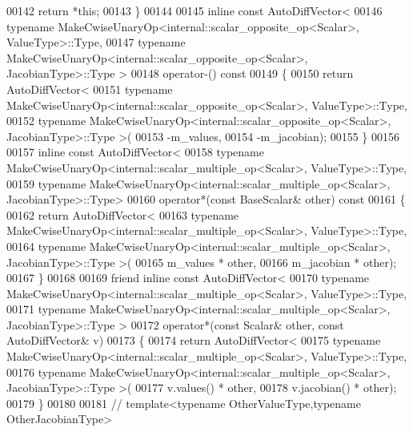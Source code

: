 \begin{DoxyCode}
00142       \textcolor{keywordflow}{return} *\textcolor{keyword}{this};
00143     \}
00144 
00145     \textcolor{keyword}{inline} \textcolor{keyword}{const} AutoDiffVector<
00146       \textcolor{keyword}{typename} MakeCwiseUnaryOp<internal::scalar\_opposite\_op<Scalar>, ValueType>::Type,
00147       \textcolor{keyword}{typename} MakeCwiseUnaryOp<internal::scalar\_opposite\_op<Scalar>, JacobianType>::Type >
00148     operator-()\textcolor{keyword}{ const}
00149 \textcolor{keyword}{    }\{
00150       \textcolor{keywordflow}{return} AutoDiffVector<
00151         \textcolor{keyword}{typename} MakeCwiseUnaryOp<internal::scalar\_opposite\_op<Scalar>, ValueType>::Type,
00152         \textcolor{keyword}{typename} MakeCwiseUnaryOp<internal::scalar\_opposite\_op<Scalar>, JacobianType>::Type >(
00153           -m\_values,
00154           -m\_jacobian);
00155     \}
00156 
00157     \textcolor{keyword}{inline} \textcolor{keyword}{const} AutoDiffVector<
00158       \textcolor{keyword}{typename} MakeCwiseUnaryOp<internal::scalar\_multiple\_op<Scalar>, ValueType>::Type,
00159       \textcolor{keyword}{typename} MakeCwiseUnaryOp<internal::scalar\_multiple\_op<Scalar>, JacobianType>::Type>
00160     operator*(\textcolor{keyword}{const} BaseScalar& other)\textcolor{keyword}{ const}
00161 \textcolor{keyword}{    }\{
00162       \textcolor{keywordflow}{return} AutoDiffVector<
00163         \textcolor{keyword}{typename} MakeCwiseUnaryOp<internal::scalar\_multiple\_op<Scalar>, ValueType>::Type,
00164         \textcolor{keyword}{typename} MakeCwiseUnaryOp<internal::scalar\_multiple\_op<Scalar>, JacobianType>::Type >(
00165           m\_values * other,
00166           m\_jacobian * other);
00167     \}
00168 
00169     \textcolor{keyword}{friend} \textcolor{keyword}{inline} \textcolor{keyword}{const} AutoDiffVector<
00170       \textcolor{keyword}{typename} MakeCwiseUnaryOp<internal::scalar\_multiple\_op<Scalar>, ValueType>::Type,
00171       \textcolor{keyword}{typename} MakeCwiseUnaryOp<internal::scalar\_multiple\_op<Scalar>, JacobianType>::Type >
00172     operator*(\textcolor{keyword}{const} Scalar& other, \textcolor{keyword}{const} AutoDiffVector& v)
00173     \{
00174       \textcolor{keywordflow}{return} AutoDiffVector<
00175         \textcolor{keyword}{typename} MakeCwiseUnaryOp<internal::scalar\_multiple\_op<Scalar>, ValueType>::Type,
00176         \textcolor{keyword}{typename} MakeCwiseUnaryOp<internal::scalar\_multiple\_op<Scalar>, JacobianType>::Type >(
00177           v.values() * other,
00178           v.jacobian() * other);
00179     \}
00180 
00181 \textcolor{comment}{//     template<typename OtherValueType,typename OtherJacobianType>}

\end{DoxyCode}
